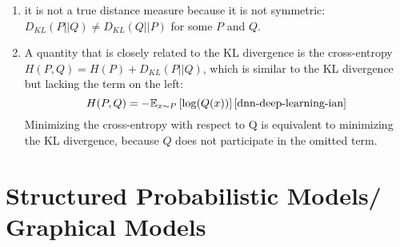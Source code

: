 \begin{enumerate}[itemsep=0.2cm]
    \item it is not a true distance measure because it is not symmetric: $D_{KL}(P||Q) \neq D_{KL}(Q||P)$ for some $P$ and $Q$.

    \item A quantity that is closely related to the KL divergence is the cross-entropy $H(P,Q) = H(P ) + D_{KL}(P||Q)$, which is similar to the KL divergence but lacking the term on the left:
    \[
        H(P,Q)
        = -\mathbb{E}_{x\sim P} \dSquareBrac{\log(Q(x))}
        \hfill \text{\cite{dnn-deep-learning-ian}}
    \]
    Minimizing the cross-entropy with respect to Q is equivalent to minimizing the KL divergence, because $Q$ does not participate in the omitted term.
    
\end{enumerate}


\section{Structured Probabilistic Models/ Graphical Models \cite{dnn-deep-learning-ian}} \label{Structured Probabilistic Models/ Graphical Models}

